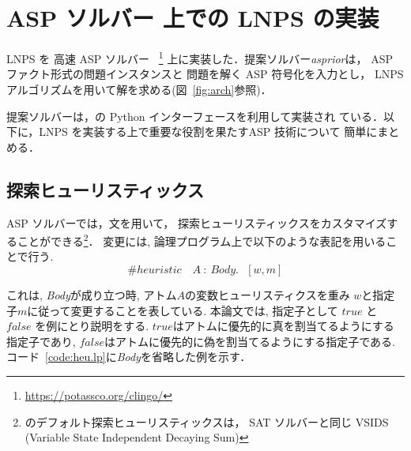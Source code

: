 \chapter{ASP ソルバー 上での LNPS の実装}



LNPS を 高速 ASP ソルバー
{\clingo}~\footnote{\url{https://potassco.org/clingo/}}
上に実装した．提案ソルバー\textit{asprior}は，
ASP ファクト形式の問題インスタンスと
問題を解く ASP 符号化を入力とし，
LNPS アルゴリズムを用いて解を求める(図~\ref{fig:arch}参照)．

提案ソルバーは，{\clingo}の Python インターフェースを利用して実装され
ている．以下に，LNPS を実装する上で重要な役割を果たすASP 技術について
簡単にまとめる．

\section{探索ヒューリスティックス}






ASP ソルバー{\clingo}では，文を用いて，
探索ヒューリスティックスをカスタマイズすることができる\footnote{%
{\clingo}のデフォルト探索ヒューリスティックスは，
SAT ソルバーと同じ VSIDS (Variable State Independent Decaying Sum)}．
変更には, 論理プログラム上で以下のような表記を用いることで行う. 
\begin{displaymath}
\#heuristic \quad A~ : ~Body. ~~~[w,m]
\end{displaymath}

これは, \textit{Body}が成り立つ時, アトム$A$の変数ヒューリスティクスを重み
$w$と指定子$m$に従って変更することを表している. 
本論文では, 指定子として $true$ と $false$ を例にとり説明をする. 
$true$はアトムに優先的に真を割当てるようにする指定子であり, 
$false$はアトムに優先的に偽を割当てるようにする指定子である. 
コード~\ref{code:heu.lp}に\textit{Body}を省略した例を示す．


